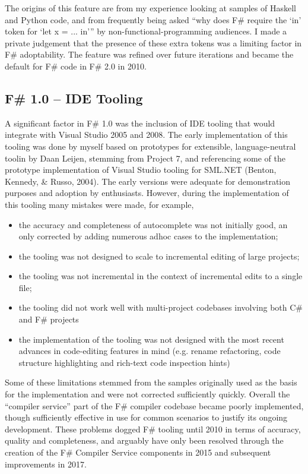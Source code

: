 \documentclass[acmsmall]{acmart}\settopmatter{}
\begin{document}
The origins of this feature are from my experience looking at samples of Haskell and Python code, and from frequently
being asked “why does F\# require the ‘in’ token for ‘let x = ... in’” by non-functional-programming audiences.  I made
a private judgement that the presence of these extra tokens was a limiting factor in F\# adoptability.  The feature was refined
over future iterations and became the default for F\# code in F\# 2.0 in 2010.

\subsection*{F\# 1.0 – IDE Tooling}

A significant factor in F\# 1.0 was the inclusion of IDE tooling that would integrate with Visual Studio 2005 and 2008.
The early implementation of this tooling was done by myself based on prototypes for extensible, language-neutral toolin
 by Daan Leijen, stemming from Project 7, and referencing some of the prototype implementation of Visual Studio tooling
for SML.NET (Benton, Kennedy, \& Russo, 2004). The early versions were adequate for demonstration purposes and
adoption by enthusiasts.  However, during the implementation of this tooling many mistakes were made, for example, 

\begin{itemize}
\item the accuracy and completeness of autocomplete was not initially good, an only corrected by adding numerous adhoc cases to the implementation;
\item the tooling was not designed to scale to incremental editing of large projects;
\item the tooling was not incremental in the context of incremental edits to a single file;
\item the tooling did not work well with multi-project codebases involving both C\# and F\# projects
\item the implementation of the tooling was not designed with the most recent advances in code-editing features in mind (e.g. rename refactoring, code structure highlighting and rich-text code inspection hints) 
\end{itemize}

Some of these limitations stemmed from the samples originally used as the basis for the implementation and were not
corrected sufficiently quickly.  Overall the “compiler service” part of the F\# compiler codebase became poorly implemented,
though sufficiently effective in use for common scenarios to justify its ongoing development.  These problems
dogged F\# tooling until 2010 in terms of accuracy, quality and completeness, and arguably have only been resolved
through the creation of the F\# Compiler Service components in 2015 and subsequent improvements in 2017.  
\end{document}

